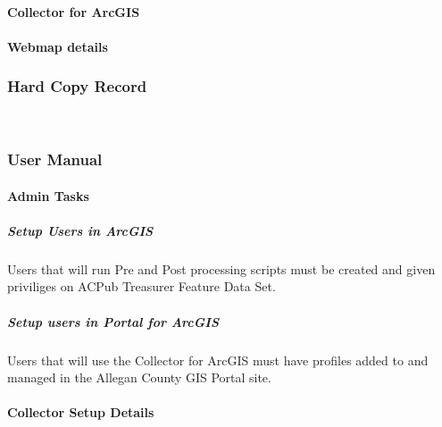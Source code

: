 \documentclass[class=article , crop=false, titlepage, twoside, multi={itemize, figure, verbatim}, float=false]{standalone}
\begin{document}
\paragraph{Collector for ArcGIS}



\paragraph{Webmap details}

\clearpage




\subsubsection{Hard Copy Record}
\clearpage
\



\subsubsection{User Manual}

\paragraph{Admin Tasks}

\subparagraph{Setup Users in ArcGIS}Users that will run Pre and Post processing scripts must be created and given priviliges on ACPub Treasurer Feature Data Set.

\subparagraph{Setup users in Portal for ArcGIS}Users that will use the Collector for ArcGIS must have profiles added to and managed in the Allegan County GIS Portal site.


\paragraph{Collector Setup Details}
\end{document}
